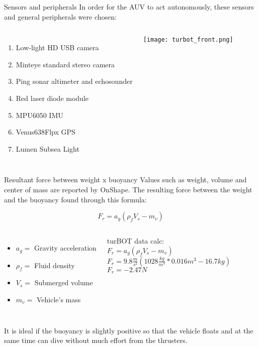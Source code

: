 \begin{frame}[c]{Sensors and peripherals}
  \transboxout[duration=0.5]
  In order for the AUV to act autonomously, these sensors and general peripherals were chosen:
  \begin{columns}
      \begin{enumerate}
        \item Low-light HD USB camera
        \item Minteye standard stereo camera
        \item Ping sonar altimeter and echosounder
        \item Red laser diode module
        \item MPU6050 IMU
        \item Venus638Flpx GPS
        \item Lumen Subsea Light
      \end{enumerate}
      \texttt{[image: turbot\_front.png]}      
  \end{columns}
\end{frame}


\begin{frame}[c]{Resultant force between weight x buoyancy}
  Values such as weight, volume and center of mass are reported by OnShape. The resulting force between the weight and the buoyancy found through this formula:
  
  \begin{equation} 
    F_{r} = a_{g}(\rho_{f} V_{s} - m_{v})
  \end{equation}
  \begin{columns}
      \begin{itemize}
        \item $a_{g} =$ Gravity acceleration
        \item $\rho_{f} =$ Fluid density
        \item $V_{s} =$ Submerged volume
        \item $m_{v} =$ Vehicle's mass
      \end{itemize}
      turBOT data calc: \\
      $F_{r} = a_{g}(\rho_{f} V_{s} - m_{v})$ \\
      $F_{r} = 9.8 \frac{m}{s^2}(1028 \frac{kg}{m^3}* 0.016 m^3 - 16.7 kg)$ \\
      $F_{r} = -2.47 N$
  \end{columns}
  
  It is ideal if the buoyancy is slightly positive so that the vehicle floats and at the same time can dive without much effort from the thrusters.  
\end{frame}

